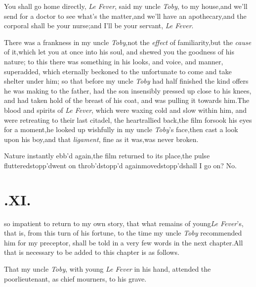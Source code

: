 \documentclass{article}
\begin{document}
\tsh You shall go home directly, \textit{Le Fever}, said
my uncle \textit{Toby}, to my house,\break\tsk and we’ll send for a
doctor to see what’s the matter,\tsk and we’ll have
an apothecary,\tsk and the corporal shall be your
nurse;\tsh and I’ll be your servant,\break
\textit{Le Fever}.

There was a frankness in my uncle \textit{Toby},\tsk not the
\textit{effect} of familiarity,\tsk but the \textit{cause} of
it,\tsk which let you at once into his soul, and shewed you the
goodness of his nature; to this there was something in his looks,
and voice, and manner, superadded, which eternally beckoned to the
unfortunate to come and take shelter under him; so that before my
uncle \textit{Toby} had half finished the kind offers he was making
to the father, had the son insensibly pressed up close to his
knees, and had taken hold of the breast of his coat, and was
pulling it towards him.\tsh The blood and spirits of \textit{Le
Fever}, which were waxing cold and\break
slow within him, and were
retreating to their last citadel, the heart\tsk rallied
back,\tsk the film forsook his eyes for a moment,\tsk he looked
up wishfully in my uncle \textit{Toby}’s face,\tsk then cast
a look upon his boy,\tsh and that \textit{ligament}, fine as
it was,\tsk was never broken.\tsh

Nature instantly ebb’d again,\tsk the film returned to
its place,\tsh the pulse
fluttered\tsh stopp’d\tsh went on\tsh\break
\tsh throb’d\tsh stopp’d again\tsh moved\tsh stopp’d\tsh shall
I go on?\tsh\break
No.

\section{.\enspace XI.}

 so impatient to return to my own
story, that what remains of young\break\textit{Le Fever}’s, that is,
from this turn of his fortune, to the time my uncle
\textit{Toby}\break
recommended him for my preceptor, shall be told in a very few words
in the next chapter.\tsk All that is necessary to be added to
this chapter is as follows.\tsk 

That my uncle \textit{Toby}, with young \textit{Le Fever} in his
hand, attended the poor\break lieutenant, as chief mourners, to his\break
grave.
\end{document}
